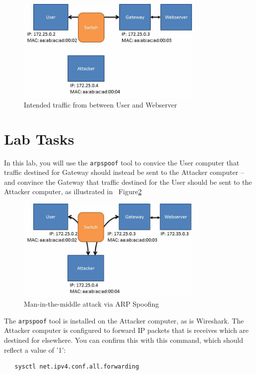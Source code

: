 \begin{figure}[H]
\begin{center}
\includegraphics [width=0.8\textwidth]{figure1.jpg}
\end{center}
\caption{Intended traffic from between User and Webserver}
\label{fig:intended}
\end{figure}

\section{Lab Tasks}
In this lab, you will use the {\tt arpspoof} tool to convice the User computer that
traffic destined for Gateway should instead be sent to the Attacker computer -- and
convince the Gateway that traffic destined for the User should be sent to the Attacker
computer, as illustrated in ~Figure\ref{fig:spoofed}
\begin{figure}[H]
\begin{center}
\includegraphics [width=0.8\textwidth]{figure2.jpg}
\end{center}
\caption{Man-in-the-middle attack via ARP Spoofing}
\label{fig:spoofed}
\end{figure}

The {\tt arpspoof} tool is installed on the Attacker computer, as is Wireshark.
The Attacker computer is configured to forward IP packets that is receives which
are destined for elsewhere.  You can confirm this with this command, which should
reflect a value of '1':
\begin{verbatim}
   sysctl net.ipv4.conf.all.forwarding
\end{verbatim}

